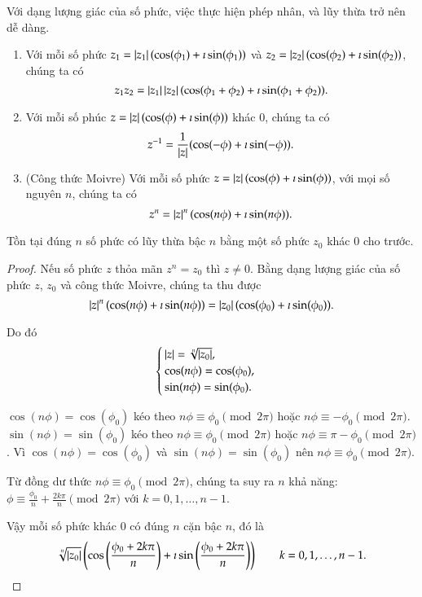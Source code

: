 Với dạng lượng giác của số phức, việc thực hiện phép nhân, và lũy thừa trở nên dễ dàng.
\begin{theorem}
	\begin{enumerate}[label={(\roman*)}]
		\item Với mỗi số phức $z_{1} = \left\vert{z_{1}}\right\vert(\cos(\phi_{1}) + \imath\sin(\phi_{1}))$ và $z_{2} = \left\vert{z_{2}}\right\vert(\cos(\phi_{2}) + \imath\sin(\phi_{2}))$, chúng ta có
		      \[
			      z_{1}z_{2} = \left\vert{z_{1}}\right\vert\left\vert{z_{2}}\right\vert(\cos(\phi_{1}+\phi_{2}) + \imath\sin(\phi_{1} + \phi_{2})).
		      \]
		\item Với mỗi số phúc $z = \left\vert{z}\right\vert(\cos(\phi) + \imath\sin(\phi))$ khác $0$, chúng ta có
		      \[
			      z^{-1} = \frac{1}{\left\vert{z}\right\vert}(\cos(-\phi) + \imath\sin(-\phi)).
		      \]
		\item (Công thức Moivre) Với mỗi số phức $z = \left\vert{z}\right\vert(\cos(\phi) + \imath\sin(\phi))$, với mọi số nguyên $n$, chúng ta có
		      \[
			      z^{n} = \left\vert{z}\right\vert^{n}(\cos(n\phi) + \imath\sin(n\phi)).
		      \]
	\end{enumerate}
\end{theorem}

\begin{theorem}
	Tồn tại đúng $n$ số phức có lũy thừa bậc $n$ bằng một số phức $z_{0}$ khác $0$ cho trước.
\end{theorem}

\begin{proof}
	Nếu số phức $z$ thỏa mãn $z^{n} = z_{0}$ thì $z\ne 0$. Bằng dạng lượng giác của số phức $z$, $z_{0}$ và công thức Moivre, chúng ta thu được
	\[
		\left\vert{z}\right\vert^{n}(\cos(n\phi) + \imath\sin(n\phi)) = \left\vert{z_{0}}\right\vert(\cos(\phi_{0}) + \imath\sin(\phi_{0})).
	\]

	Do đó
	\[
		\begin{cases}
			\left\vert{z}\right\vert = \sqrt[n]{\left\vert{z_{0}}\right\vert}, \\
			\cos(n\phi) = \cos(\phi_{0}),    \\
			\sin(n\phi) = \sin(\phi_{0}).
		\end{cases}
	\]

	$\cos(n\phi) = \cos(\phi_{0})$ kéo theo $n\phi \equiv \phi_{0} \pmod{2\pi}$ hoặc $n\phi\equiv -\phi_{0}\pmod{2\pi}$. $\sin(n\phi) = \sin(\phi_{0})$ kéo theo $n\phi \equiv \phi_{0} \pmod{2\pi}$ hoặc $n\phi\equiv \pi-\phi_{0}\pmod{2\pi}$. Vì $\cos(n\phi) = \cos(\phi_{0})$ và $\sin(n\phi) = \sin(\phi_{0})$ nên $n\phi \equiv \phi_{0}\pmod{2\pi}$.

	Từ đồng dư thức $n\phi \equiv \phi_{0}\pmod{2\pi}$, chúng ta suy ra $n$ khả năng: $\phi\equiv \frac{\phi_{0}}{n} + \frac{2k\pi}{n} \pmod{2\pi}$ với $k = 0, 1,\ldots, n-1$.

	Vậy mỗi số phức khác $0$ có đúng $n$ cặn bậc $n$, đó là
	\[
		\sqrt[n]{\left\vert{z_{0}}\right\vert}\left(\cos\left(\frac{\phi_{0} + 2k\pi}{n}\right) + \imath\sin\left(\frac{\phi_{0} + 2k\pi}{n}\right)\right)\qquad k = 0, 1, \ldots, n-1.
	\]
\end{proof}

